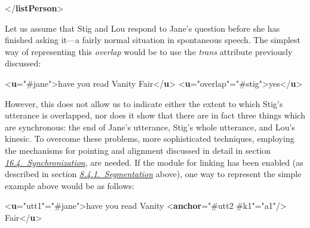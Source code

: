 \begin{shaded}
{</\textbf{listPerson}>}\end{shaded}\egroup\par \noindent  Let us assume that Stig and Lou respond to Jane's question before she has finished asking it—a fairly normal situation in spontaneous speech. The simplest way of representing this \textit{overlap} would be to use the {\itshape trans} attribute previously discussed: \par\bgroup{}\exampleFont \begin{shaded}\noindent\mbox{}{<\textbf{u}\hspace*{1em}{who}="{\#jane}">}have you read Vanity Fair{</\textbf{u}>}\mbox{}\newline 
{<\textbf{u}\hspace*{1em}{trans}="{overlap}"\hspace*{1em}{who}="{\#stig}">}yes{</\textbf{u}>}\end{shaded}\egroup\par \noindent  However, this does not allow us to indicate either the extent to which Stig's utterance is overlapped, nor does it show that there are in fact three things which are synchronous: the end of Jane's utterance, Stig's whole utterance, and Lou's kinesic. To overcome these problems, more sophisticated techniques, employing the mechanisms for pointing and alignment discussed in detail in section \textit{\hyperref[SASY]{16.4.\ Synchronization}}, are needed. If the module for linking has been enabled (as described in section \textit{\hyperref[TSSASE]{8.4.1.\ Segmentation}} above), one way to represent the simple example above would be as follows: \par\bgroup{}\exampleFont \begin{shaded}\noindent\mbox{}{<\textbf{u}\hspace*{1em}{xml:id}="{utt1}"\hspace*{1em}{who}="{\#jane}">}have you read Vanity {<\textbf{anchor}\hspace*{1em}{synch}="{\#utt2 \#k1}"\hspace*{1em}{xml:id}="{a1}"/>} Fair{</\textbf{u}>}\mbox{}\newline 

\end{shaded}
